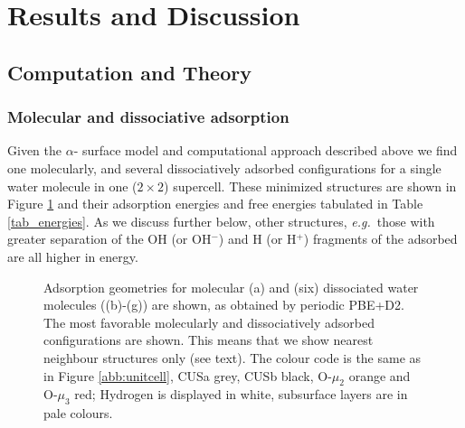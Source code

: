 \documentclass[twoside,twocolumn,9pt]{article}
\begin{document}
\section{Results and Discussion}
\subsection{Computation and Theory\label{sec3}}

\subsubsection{Molecular and dissociative adsorption}
Given the $\alpha$- surface model and computational approach described above we find one molecularly, and several dissociatively adsorbed configurations for a single water molecule in one ($2\times 2$) supercell. These minimized structures are shown in Figure \ref{abb:ads-geoms} and their adsorption energies and free energies tabulated in Table \ref{tab_energies}. As we discuss further below, other structures, \textit{e.g.}\ those with greater separation of the OH (or OH$^-$) and H (or H$^+$) fragments of the adsorbed  are all higher in energy.  

\begin{figure}[!h]
 \centering
{}
 \quad\quad
  \quad
{}
 \quad
{}
\quad
{}
 \quad
{}
 \quad
{}
 \caption{Adsorption geometries for molecular (a) and (six) dissociated water molecules ((b)-(g)) are shown, as obtained by periodic PBE+D2. The most favorable molecularly and dissociatively adsorbed configurations are shown. This means that we show nearest neighbour structures only (see text). The colour code is the same as in Figure \ref{abb:unitcell}, CUSa grey, CUSb black, O-$\mu_2$ orange and O-$\mu_3$ red; Hydrogen is displayed in white, subsurface layers are in pale colours.}
        \label{abb:ads-geoms}
 \end{figure}
\end{document}
